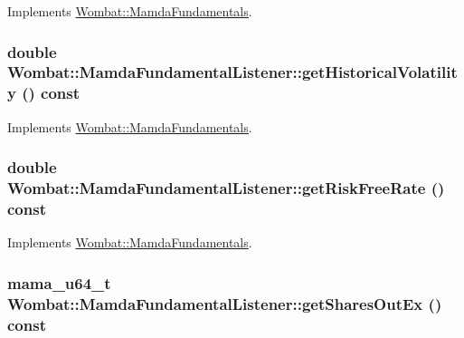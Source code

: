 Implements \hyperlink{classWombat_1_1MamdaFundamentals_b49dbddda075e93738faebcc391ac223}{Wombat::Mamda\-Fundamentals}.\hypertarget{classWombat_1_1MamdaFundamentalListener_975c5df94470d5d3a50f04f9bf86a741}{
\subsubsection[getHistoricalVolatility]{\setlength{\rightskip}{0pt plus 5cm}double Wombat::Mamda\-Fundamental\-Listener::get\-Historical\-Volatility () const}}
\label{classWombat_1_1MamdaFundamentalListener_975c5df94470d5d3a50f04f9bf86a741}




Implements \hyperlink{classWombat_1_1MamdaFundamentals_be98df579caf8109ed31669009a0a4b1}{Wombat::Mamda\-Fundamentals}.\hypertarget{classWombat_1_1MamdaFundamentalListener_7ee4b7ae2fa8cf35ff7892a7bb2831ef}{
\subsubsection[getRiskFreeRate]{\setlength{\rightskip}{0pt plus 5cm}double Wombat::Mamda\-Fundamental\-Listener::get\-Risk\-Free\-Rate () const}}
\label{classWombat_1_1MamdaFundamentalListener_7ee4b7ae2fa8cf35ff7892a7bb2831ef}




Implements \hyperlink{classWombat_1_1MamdaFundamentals_b2e1924e7f3329a29376f6ac60c7972e}{Wombat::Mamda\-Fundamentals}.\hypertarget{classWombat_1_1MamdaFundamentalListener_2dff10a145ad0a1e0b8e3223720eead2}{
\subsubsection[getSharesOutEx]{\setlength{\rightskip}{0pt plus 5cm}mama\_\-u64\_\-t Wombat::Mamda\-Fundamental\-Listener::get\-Shares\-Out\-Ex () const}}
\label{classWombat_1_1MamdaFundamentalListener_2dff10a145ad0a1e0b8e3223720eead2}


